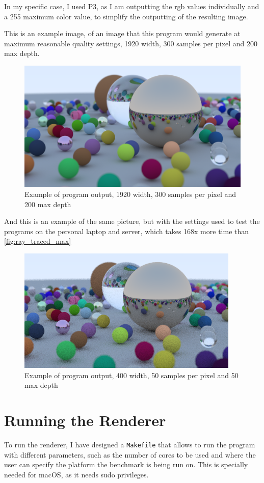 In my specific case, I used P3, as I am outputting the \gls{rgb} values individually and a 255 maximum color value, to simplify the outputting of the resulting image.

This is an example image, of an image that this program would generate at maximum reasonable quality settings, 1920 width, 300 samples per pixel and 200 max depth.

\begin{figure}[h]
    \centering
    \includegraphics[width=0.65\linewidth]{img/ray_traced_balls.png}
    \caption[Sample program output (high resolution)]{Example of program output, 1920 width, 300 samples per pixel and 200 max depth}
    \label{fig:ray_traced_max}
\end{figure}

And this is an example of the same picture, but with the settings used to test the programs on the personal laptop and server, which takes 168x more time than \autoref{fig:ray_traced_max}

\begin{figure}[h]
    \centering
    \includegraphics[width=0.65\linewidth]{img/regular_spheres_output.png}
    \caption[Sample program output default configuration]{Example of program output, 400 width, 50 samples per pixel and 50 max depth}
    \label{fig:ray_traced_average}
\end{figure}

\section{Running the Renderer}
\label{sec:running_program}
To run the renderer, I have designed a \texttt{Makefile} that allows to run the program with different parameters, such as the number of cores to be used and where the user can specify the platform the benchmark is being run on. This is specially needed for macOS, as it needs \gls{sudo} privileges.


